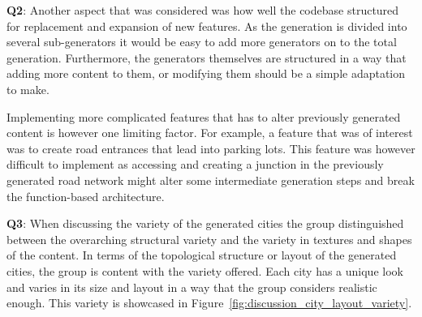 \textbf{Q2}:
Another aspect that was considered was how well the codebase structured for replacement and expansion of new features.
As the generation is divided into several sub-generators it would be easy to add more generators on to the total generation.
Furthermore, the generators themselves are structured in a way that adding more content to them, or modifying them should be a simple adaptation to make. 

Implementing more complicated features that has to alter previously generated content is however one limiting factor.
For example, a feature that was of interest was to create road entrances that lead into parking lots.
This feature was however difficult to implement as accessing and creating a junction in the previously generated road network might alter some intermediate generation steps and break the function-based architecture.

\textbf{Q3}:
When discussing the variety of the generated cities the group distinguished between the overarching structural variety and the variety in textures and shapes of the content.
In terms of the topological structure or layout of the generated cities, the group is content with the variety offered.
Each city has a unique look and varies in its size and layout in a way that the group considers realistic enough.
This variety is showcased in Figure~\ref{fig:discussion_city_layout_variety}.

